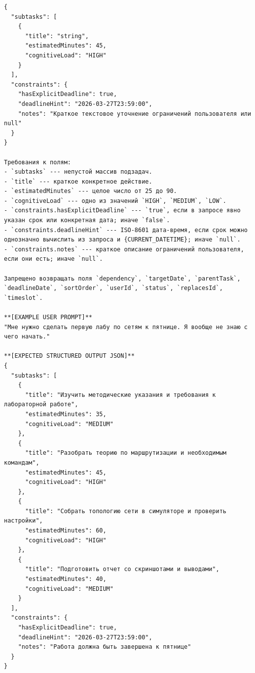 \begin{Verbatim}[breaklines=true,breakanywhere=true]
{
  "subtasks": [
    {
      "title": "string",
      "estimatedMinutes": 45,
      "cognitiveLoad": "HIGH"
    }
  ],
  "constraints": {
    "hasExplicitDeadline": true,
    "deadlineHint": "2026-03-27T23:59:00",
    "notes": "Краткое текстовое уточнение ограничений пользователя или null"
  }
}

Требования к полям:
- `subtasks` --- непустой массив подзадач.
- `title` --- краткое конкретное действие.
- `estimatedMinutes` --- целое число от 25 до 90.
- `cognitiveLoad` --- одно из значений `HIGH`, `MEDIUM`, `LOW`.
- `constraints.hasExplicitDeadline` --- `true`, если в запросе явно указан срок или конкретная дата; иначе `false`.
- `constraints.deadlineHint` --- ISO-8601 дата-время, если срок можно однозначно вычислить из запроса и {CURRENT_DATETIME}; иначе `null`.
- `constraints.notes` --- краткое описание ограничений пользователя, если они есть; иначе `null`.

Запрещено возвращать поля `dependency`, `targetDate`, `parentTask`, `deadlineDate`, `sortOrder`, `userId`, `status`, `replacesId`, `timeslot`.

**[EXAMPLE USER PROMPT]**
"Мне нужно сделать первую лабу по сетям к пятнице. Я вообще не знаю с чего начать."

**[EXPECTED STRUCTURED OUTPUT JSON]**
{
  "subtasks": [
    {
      "title": "Изучить методические указания и требования к лабораторной работе",
      "estimatedMinutes": 35,
      "cognitiveLoad": "MEDIUM"
    },
    {
      "title": "Разобрать теорию по маршрутизации и необходимым командам",
      "estimatedMinutes": 45,
      "cognitiveLoad": "HIGH"
    },
    {
      "title": "Собрать топологию сети в симуляторе и проверить настройки",
      "estimatedMinutes": 60,
      "cognitiveLoad": "HIGH"
    },
    {
      "title": "Подготовить отчет со скриншотами и выводами",
      "estimatedMinutes": 40,
      "cognitiveLoad": "MEDIUM"
    }
  ],
  "constraints": {
    "hasExplicitDeadline": true,
    "deadlineHint": "2026-03-27T23:59:00",
    "notes": "Работа должна быть завершена к пятнице"
  }
}
\end{Verbatim}
